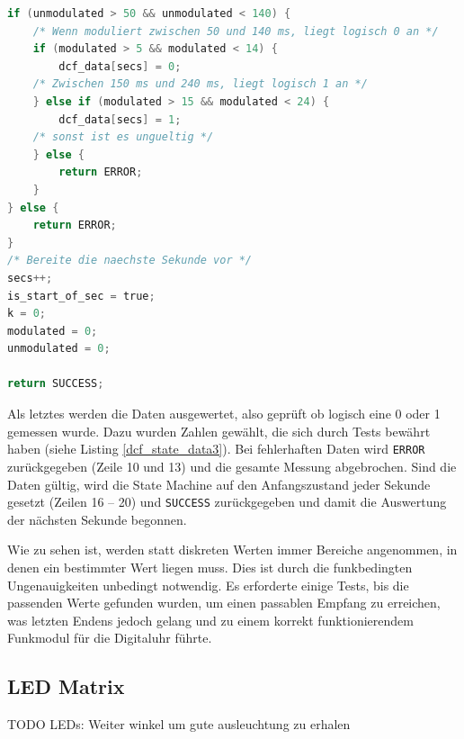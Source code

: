 %
\begin{lstlisting}[language=C,label=dcf_state_data3,caption=Empfang des DCF77 Signals - Sekunde analysieren]
if (unmodulated > 50 && unmodulated < 140) {
    /* Wenn moduliert zwischen 50 und 140 ms, liegt logisch 0 an */
    if (modulated > 5 && modulated < 14) {
        dcf_data[secs] = 0;
    /* Zwischen 150 ms und 240 ms, liegt logisch 1 an */
    } else if (modulated > 15 && modulated < 24) {
        dcf_data[secs] = 1;
    /* sonst ist es ungueltig */
    } else {
        return ERROR;
    }
} else {
    return ERROR;
}
/* Bereite die naechste Sekunde vor */
secs++;
is_start_of_sec = true;
k = 0;
modulated = 0;
unmodulated = 0;

return SUCCESS;
\end{lstlisting}
%
Als letztes werden die Daten ausgewertet, also geprüft ob logisch eine 0 oder 1 gemessen wurde. Dazu wurden Zahlen gewählt, die sich durch Tests bewährt haben (siehe Listing \ref{dcf_state_data3}). Bei fehlerhaften Daten wird \texttt{ERROR} zurückgegeben (Zeile 10 und 13) und die gesamte Messung abgebrochen. Sind die Daten gültig, wird die State Machine auf den Anfangszustand jeder Sekunde gesetzt (Zeilen 16 -- 20) und \texttt{SUCCESS} zurückgegeben und damit die Auswertung der nächsten Sekunde begonnen.

Wie zu sehen ist, werden statt diskreten Werten immer Bereiche angenommen, in denen ein bestimmter Wert liegen muss. Dies ist durch die funkbedingten Ungenauigkeiten unbedingt notwendig. Es erforderte einige Tests, bis die passenden Werte gefunden wurden, um einen passablen Empfang zu erreichen, was letzten Endens jedoch gelang und zu einem korrekt funktionierendem Funkmodul für die Digitaluhr führte.
%
\subsection{LED Matrix}
TODO
LEDs: Weiter winkel um gute ausleuchtung zu erhalen

